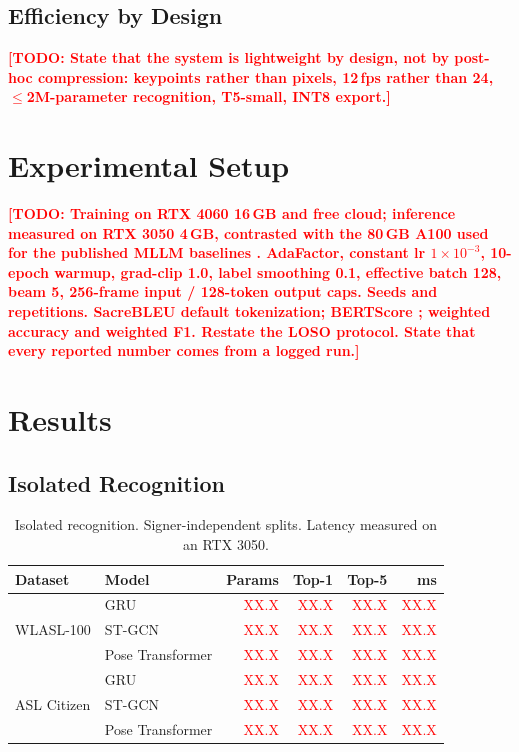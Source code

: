 \documentclass[conference]{IEEEtran}
\newcommand{\TODO}[1]{\textcolor{red}{\textbf{[TODO: #1]}}}
\newcommand{\NUM}{\textcolor{red}{XX.X}}
\begin{document}
\subsection{Efficiency by Design}
\TODO{State that the system is lightweight by design, not by post-hoc compression: keypoints rather
than pixels, 12\,fps rather than 24, $\leq$2M-parameter recognition, T5-small, INT8 export.}

\section{Experimental Setup}
\label{sec:setup}
\TODO{Training on RTX 4060 16\,GB and free cloud; \textbf{inference measured on RTX 3050 4\,GB},
contrasted with the 80\,GB A100 used for the published MLLM baselines \cite{chua2025emosign}.
AdaFactor, constant lr $1\times10^{-3}$, 10-epoch warmup, grad-clip 1.0, label smoothing 0.1,
effective batch 128, beam 5, 256-frame input / 128-token output caps. Seeds and repetitions.
SacreBLEU \cite{post2018sacrebleu} default tokenization; BERTScore \cite{zhang2020bertscore};
weighted accuracy and weighted F1. Restate the LOSO protocol. State that every reported number
comes from a logged run.}

\section{Results}
\label{sec:results}

\subsection{Isolated Recognition}
\begin{table}[t]
\caption{Isolated recognition. Signer-independent splits. Latency measured on an RTX 3050.}
\label{tab:recognition}
\centering
\small
\begin{tabular}{@{}llrrrr@{}}
\toprule
Dataset & Model & Params & Top-1 & Top-5 & ms \\
\midrule
\multirow{3}{*}{WLASL-100}
 & GRU              & \NUM & \NUM & \NUM & \NUM \\
 & ST-GCN           & \NUM & \NUM & \NUM & \NUM \\
 & Pose Transformer & \NUM & \NUM & \NUM & \NUM \\
\midrule
\multirow{3}{*}{ASL Citizen}
 & GRU              & \NUM & \NUM & \NUM & \NUM \\
 & ST-GCN           & \NUM & \NUM & \NUM & \NUM \\
 & Pose Transformer & \NUM & \NUM & \NUM & \NUM \\
\bottomrule
\end{tabular}
\end{table}
\end{document}
